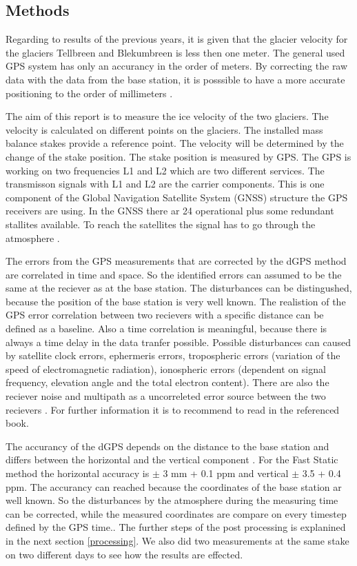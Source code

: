 
\subsection{Methods}

Regarding to results of the previous years, it is given that the glacier velocity for the glaciers Tellbreen and Blekumbreen is less then one meter.
The general used GPS system has only an accurancy in the order of meters.
By correcting the raw data with the data from the base station, it is posssible to have a more accurate positioning to the order of millimeters \citep{UGPS}.

The aim of this report is to measure the ice velocity of the two glaciers.
The velocity is calculated on different points on the glaciers. 
The installed mass balance stakes provide a reference point.
The velocity will be determined by the change of the stake position.
The stake position is measured by GPS. 
The GPS is working on two frequencies L1 and L2 which are two different services.
The transmisson signals with L1 and L2 are the carrier components. 
This is one component of the Global Navigation Satellite System (GNSS) structure the GPS receivers are using.
In the GNSS there ar 24 operational plus some redundant stallites available.
To reach the satellites the signal has to go through the atmosphere \citep{curcherdgps}.
\medskip

The errors from the GPS measurements that are corrected by the dGPS method are correlated in time and space.
So the identified errors can assumed to be the same at the reciever as at the base station.
The disturbances can be distingushed, because the position of the base station is very well known.
The realistion of the GPS error correlation between two recievers with a specific distance can be defined as a baseline.
Also a time correlation is meaningful, because there is always a time delay in the data tranfer possible.
Possible disturbances can caused by satellite clock errors, ephermeris errors, tropospheric errors (variation of the speed of electromagnetic radiation), ionospheric errors (dependent on signal frequency, elevation angle and the total electron content). 
There are also the reciever noise and multipath as a uncorreleted error source between the two recievers \citep{UGPS}.
For further information it is to recommend to read in the referenced book.

The accurancy of the dGPS depends on the distance to the base station and differs between the horizontal and the vertical component \citep{Trquickstart}.
For the Fast Static method the horizontal accuracy is $ \pm $ 3 mm + 0.1 ppm and vertical $ \pm $ 3.5 + 0.4 ppm.
The accurancy can reached because the coordinates of the base station ar well known. 
So the disturbances by the atmosphere during the measuring time can be corrected, while the measured coordinates are compare on every timestep defined by the GPS time.. 
The further steps of the post processing is explanined in the next section 
\ref{processing}.
We also did two measurements at the same stake on two different days to see how the results are effected.
\medskip

